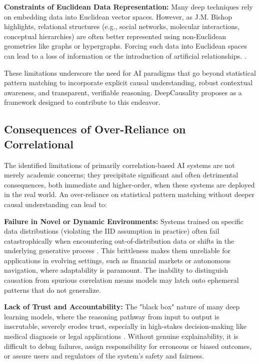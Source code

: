 \textbf{Constraints of Euclidean Data Representation:} Many deep techniques rely on embedding data into Euclidean vector spaces. However, as J.M. Bishop highlights, relational structures (e.g., social networks, molecular interactions, conceptual hierarchies) are often better represented using non-Euclidean geometries like graphs or hypergraphs. Forcing such data into Euclidean spaces can lead to a loss of information or the introduction of artificial relationships. \cite{Ouvrard2020Hypergraphs, bishop2020artificialintelligencestupidcausal}. 

These limitations underscore the need for AI paradigms that go beyond statistical pattern matching to incorporate explicit causal understanding, robust contextual awareness, and transparent, verifiable reasoning. DeepCausality proposes as a framework designed to contribute to this endeavor.


\subsection{Consequences of Over-Reliance on Correlational}
\label{subsec:consequences_of_limitations}

The identified limitations of primarily correlation-based AI systems are not merely academic concerns; they precipitate significant and often detrimental consequences, both immediate and higher-order, when these systems are deployed in the real world. An over-reliance on statistical pattern matching without deeper causal understanding can lead to:


    \textbf{Failure in Novel or Dynamic Environments:} Systems trained on specific data distributions (violating the IID assumption in practice) often fail catastrophically when encountering out-of-distribution data or shifts in the underlying generative process \cite{Scholkopf2021Toward}. This brittleness makes them unreliable for applications in evolving settings, such as financial markets or autonomous navigation, where adaptability is paramount. The inability to distinguish causation from spurious correlation means models may latch onto ephemeral patterns that do not generalize.

    \textbf{Lack of Trust and Accountability:} The "black box" nature of many deep learning models, where the reasoning pathway from input to output is inscrutable, severely erodes trust, especially in high-stakes decision-making like medical diagnosis or legal applications \cite{Moraffah2020Causal, Kaddour2022Causal}. Without genuine explainability, it is difficult to debug failures, assign responsibility for erroneous or biased outcomes, or assure users and regulators of the system's safety and fairness.

